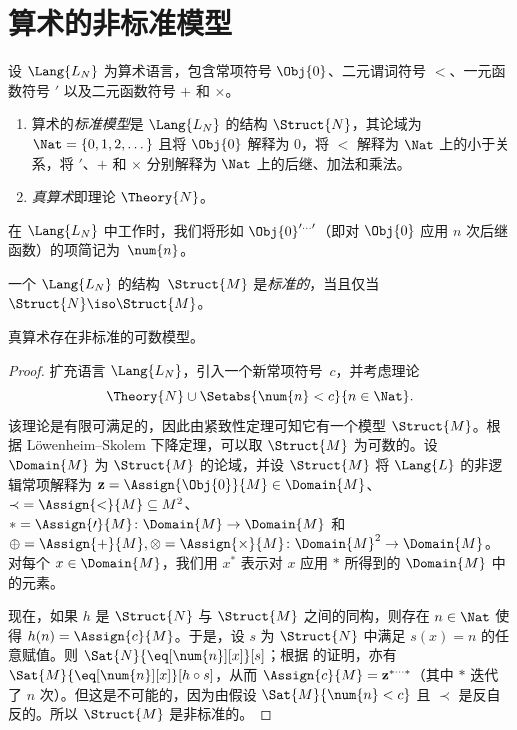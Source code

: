 \documentclass[../../../include/open-logic-section]{subfiles}
\begin{document}
\section{算术的非标准模型}

\begin{defn}
设 $\Lang{L_N}$ 为算术语言，包含常项符号 $\Obj{0}$、二元谓词符号 $<$、一元函数符号 $\prime$ 以及二元函数符号 $+$ 和 $\times$。
\begin{enumerate}
\item 算术的\emph{标准模型}是 $\Lang{L_N}$ 的结构 $\Struct{N}$，其论域为 $\Nat = \{ 0, 1, 2, \dots\}$
且将 $\Obj{0}$ 解释为 $0$，将 $<$ 解释为 $\Nat$ 上的小于关系，将 $\prime$、$+$ 和 $\times$ 分别解释为 $\Nat$ 上的后继、加法和乘法。
\item \emph{真算术}即理论 $\Theory{N}$。
\end{enumerate}
\end{defn}

在 $\Lang{L_N}$ 中工作时，我们将形如 $\Obj{0}^{\prime\dots\prime}$（即对 $\Obj{0}$ 应用 $n$ 次后继函数）的项简记为~$\num{n}$。

\begin{defn}
一个 $\Lang{L_N}$ 的结构~$\Struct{M}$ 是\emph{标准的}，当且仅当 $\Struct{N} \iso \Struct{M}$。
\end{defn}

\begin{thm}
真算术存在非标准的可数模型。
\end{thm}

\begin{proof}
扩充语言 $\Lang{L_N}$，引入一个新常项符号~$c$，并考虑理论
\[
\Theory{N} \cup \Setabs{\num{n} < c}{n \in \Nat}.
\]
该理论是有限可满足的，因此由紧致性定理可知它有一个模型 $\Struct{M}$。根据 Löwenheim–Skolem 下降定理，可以取 $\Struct{M}$ 为可数的。设 $\Domain{M}$ 为 $\Struct{M}$ 的论域，并设 $\Struct{M}$ 将 $\Lang{L}$ 的非逻辑常项解释为 $\mathbf{z} = \Assign{\Obj{0}}{M} \in \Domain{M}$、${\prec} =
\Assign{<}{M} \subseteq M^2$、$* = \Assign{\prime}{M} \colon
\Domain{M} \to \Domain{M}$ 和 $\oplus = \Assign{+}{M}, \otimes =
\Assign{\times}{M} \colon \Domain{M}^2 \to \Domain{M}$。对每个 $x \in \Domain{M}$，我们用 $x^*$ 表示对 $x$ 应用 $*$ 所得到的 $\Domain{M}$ 中的元素。

现在，如果 $h$ 是 $\Struct{N}$ 与 $\Struct{M}$ 之间的同构，则存在 $n \in \Nat$ 使得 $h(n) = \Assign{c}{M}$。于是，设 $s$ 为 $\Struct{N}$ 中满足 $s(x) = n$ 的任意赋值。则 $\Sat{N}{\eq[\num{n}][x]}[s]$；根据  的证明，亦有 $\Sat{M}{\eq[\num{n}][x]}[h \circ s]$，从而 $\Assign{c}{M} =
\mathbf{z}^{*\cdots *}$（其中 $*$ 迭代了 $n$ 次）。但这是不可能的，因为由假设 $\Sat{M}{\num{n} < c}$ 且 $\prec$ 是反自反的。所以 $\Struct{M}$ 是非标准的。
\end{proof}
\end{document}
